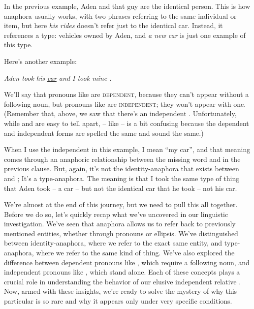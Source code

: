 In the previous example, Aden and that guy are the identical person. This is how anaphora usually works, with two phrases referring to the same individual or item, but here \textit{his rides} doesn't refer just to the identical car. Instead, it references a type: vehicles owned by Aden, and \textit{a new car} is just one example of this type.

Here's another example:

\ea \textit{Aden took his \uline{car} and I took mine \uline{\phantom{car}}.}\\
\z

We'll say that pronouns like  are \textsc{dependent}, because they can't appear without a following noun, but pronouns like  are \textsc{independent}; they won't appear with one. (Remember that, above, we saw that there's an independent . Unfortunately, while  and  are easy to tell apart,  -- like  -- is a bit confusing because the dependent and independent forms are spelled the same and sound the same.)

When I use the independent  in this example, I mean \enquote{my car}, and that meaning comes through an anaphoric relationship between the missing word and  in the previous clause. But, again, it's not the identity-anaphora that exists between  and ; It's a type-anaphora. The meaning is that I took the same type of thing that Aden took -- a car -- but not the identical car that he took -- not his car.

We're almost at the end of this journey, but we need to pull this all together. Before we do so, let's quickly recap what we've uncovered in our linguistic investigation. We've seen that anaphora allows us to refer back to previously mentioned entities, whether through pronouns or ellipsis. We've distinguished between identity-anaphora, where we refer to the exact same entity, and type-anaphora, where we refer to the same kind of thing. We've also explored the difference between dependent pronouns like , which require a following noun, and independent pronouns like , which stand alone. Each of these concepts plays a crucial role in understanding the behavior of our elusive independent relative . Now, armed with these insights, we're ready to solve the mystery of why this particular  is so rare and why it appears only under very specific conditions.


